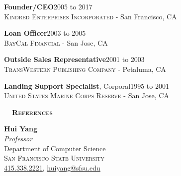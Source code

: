 \documentclass[hidelinks, 10.5pt]{article}
\def\contentwidth{0.9\linewidth}    %
\def\contentblockspacing{2.5mm}     %
\def\sectionspacing{8mm}            %
\def\sectiontocontentspacing{4mm}   %
\renewcommand{\section}[1]{
    {\fontsize{14}{14}\selectfont \textsc{\textbf{\ \ #1\ \ }}}\hrulefill
}
\begin{document}
{\vspace{\contentblockspacing}

\begin{minipage}[ct]{\contentwidth}
    \textbf{Founder/CEO}\hfill 2005 to 2017\\
    {\textsc{Kindred Enterprises Incorporated} - San Francisco, CA}
\end{minipage}

\vspace{\contentblockspacing}

\begin{minipage}[ct]{\contentwidth}
    \textbf{Loan Officer}\hfill 2003 to 2005\\
    {\textsc{BayCal Financial} - San Jose, CA}
\end{minipage}

\vspace{\contentblockspacing}

\begin{minipage}[ct]{\contentwidth}
    \textbf{Outside Sales Representative}\hfill 2001 to 2003\\
    {\textsc{TransWestern Publishing Company} - Petaluma, CA}
\end{minipage}

\vspace{\contentblockspacing}

\begin{minipage}[ct]{\contentwidth}
    \textbf{Landing Support Specialist}, Corporal\hfill 1995 to 2001\\
    {\textsc{United States Marine Corps Reserve} - San Jose, CA}
\end{minipage}

\vspace{\sectionspacing}


\section{References}

\vspace{\sectiontocontentspacing}

\begin{minipage}[ct]{\contentwidth}
    \begin{multicols}{2}
        \textbf{Hui Yang}\\
        \emph{Professor}\\
        {Department of Computer Science}\\
        \textsc{San Francisco State University}\\
        \href{tel:4153382221}{415.338.2221}, \href{mailto:huiyang@sfsu.edu}{huiyang@sfsu.edu}\\


\end{multicols}
\end{minipage}}
\end{document}

